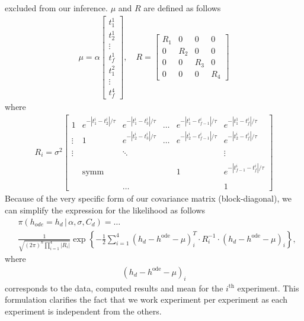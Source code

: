 \documentclass{article}
\begin{document}
excluded from our inference. $\mu$ and $R$ are defined as follows
\begin{align*}
\mu=\alpha\begin{bmatrix}t_{1}^{1}\\
t_{2}^{1}\\
\vdots\\
t_{f}^{1}\\
t_{1}^{2}\\
\vdots\\
t_{f}^{4}
\end{bmatrix},\quad R=\begin{bmatrix}R_{1} & 0 & 0 & 0\\
0 & R_{2} & 0 & 0\\
0 & 0 & R_{3} & 0\\
0 & 0 & 0 & R_{4}
\end{bmatrix}
\end{align*}
 where
\begin{align*}
R_{i}=\sigma^{2}\begin{bmatrix}1 & e^{-|t_{1}^{i}-t_{2}^{i}|/\tau} & e^{-|t_{1}^{i}-t_{3}^{i}|/\tau} & \ldots & e^{-|t_{1}^{i}-t_{f-1}^{i}|/\tau} & e^{-|t_{1}^{1}-t_{f}^{i}|/\tau}\\
\vdots & 1 & e^{-|t_{2}^{i}-t_{3}^{i}|/\tau} & \ldots & e^{-|t_{2}^{i}-t_{f-1}^{i}|/\tau} & e^{-|t_{2}^{i}-t_{f}^{i}|/\tau}\\
\\
\vdots &  & \ddots &  &  & \vdots\\
\\
 & \text{symm} &  &  & 1 & e^{-|t_{f-1}^{i}-t_{f}^{i}|/\tau}\\
\\
 &  & \ldots &  &  & 1
\end{bmatrix}
\end{align*}
 Because of the very specific form of our covariance matrix (block-diagonal),
we can simplify the expression for the likelihood as follows
\begin{align*}
 & \pi(h_{ode}=h_{d}\,|\,\alpha,\sigma,C_{d})=\ldots\\
 & \frac{1}{\sqrt{(2\pi)^{n}\prod_{i=1}^{4}|R_{i}|}}\exp\left\{ -\frac{1}{2}\sum_{i=1}^{4}\left(h_{d}-h^{\text{ode}}-\mu\right)_{i}^{T}\cdotp R_{i}^{-1}\cdotp\left(h_{d}-h^{\text{ode}}-\mu\right)_{i}\right\} ,
\end{align*}
 where
\begin{align*}
\left(h_{d}-h^{\text{ode}}-\mu\right)_{i}
\end{align*}
 corresponds to the data, computed results and mean for the $i^{\text{th}}$
experiment. This formulation clarifies the fact that we work experiment
per experiment as each experiment is independent from the others.
\end{document}
